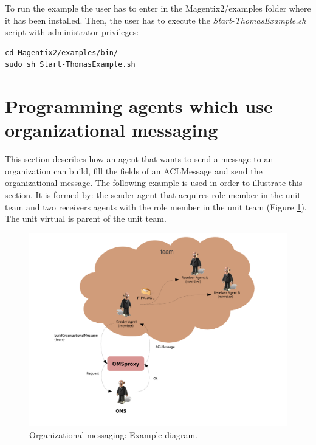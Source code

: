 To run the example the user has to enter in the Magentix2/examples folder where it has been installed. Then, the user has to execute the \textit{Start-ThomasExample.sh} script with administrator privileges: 

\begin{lstlisting}
cd Magentix2/examples/bin/
sudo sh Start-ThomasExample.sh
\end{lstlisting}


\section{Programming agents which use organizational messaging}



This section describes how an agent that wants to send a message to an organization
can build, fill the fields of an ACLMessage and send the organizational message.
The following example is used in order to illustrate this section. It is formed by: the sender agent that acquires role member in the unit team
and two receivers agents with the role member in the unit team (Figure \ref{fig:org1}). The unit virtual is parent of the unit team.

\begin{figure}[h!t]
	\centering
	\includegraphics[width=1\textwidth]{Thomas/images/org.pdf}
	\caption{Organizational messaging: Example diagram.}
	\label{fig:org1}
\end{figure}



